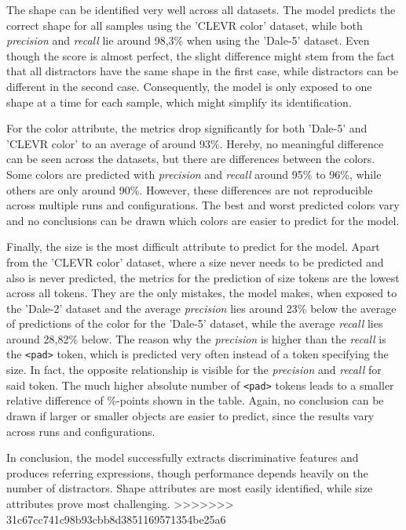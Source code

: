 \documentclass[11pt]{article}
\begin{document}
The shape can be identified very well across all datasets.
The model predicts the correct shape for all samples using the 'CLEVR color' dataset, while both \emph{precision} and \emph{recall} lie around 98,3\% when using the 'Dale-5' dataset.
Even though the score is almost perfect, the slight difference might stem from the fact that all distractors have the same shape in the first case, while distractors can be different in the second case.
Consequently, the model is only exposed to one shape at a time for each sample, which might simplify its identification.

For the color attribute, the metrics drop significantly for both 'Dale-5' and 'CLEVR color' to an average of around 93\%.
Hereby, no meaningful difference can be seen across the datasets, but there are differences between the colors.
Some colors are predicted with \emph{precision} and \emph{recall} around 95\% to 96\%, while others are only around 90\%.
However, these differences are not reproducible across multiple runs and configurations.
The best and worst predicted colors vary and no conclusions can be drawn which colors are easier to predict for the model.

Finally, the size is the most difficult attribute to predict for the model.
Apart from the 'CLEVR color' dataset, where a size never needs to be predicted and also is never predicted, the metrics for the prediction of size tokens are the lowest across all tokens.
They are the only mistakes, the model makes, when exposed to the 'Dale-2' dataset and the average \emph{precision} lies around 23\% below the average of predictions of the color for the 'Dale-5' dataset, while the average \emph{recall} lies around 28,82\% below.
The reason why the \emph{precision} is higher than the \emph{recall} is the \texttt{<pad>} token, which is predicted very often instead of a token specifying the size.
In fact, the opposite relationship is visible for the \emph{precision} and \emph{recall} for said token.
The much higher absolute number of \texttt{<pad>} tokens leads to a smaller relative difference of \%-points shown in the table.
Again, no conclusion can be drawn if larger or smaller objects are easier to predict, since the results vary across runs and configurations.

In conclusion, the model successfully extracts discriminative features and produces referring expressions, though performance depends heavily on the number of distractors. Shape attributes are most easily identified, while size attributes prove most challenging.
>>>>>>> 31c67cc741c98b93cbb8d3851169571354be25a6
\end{document}
